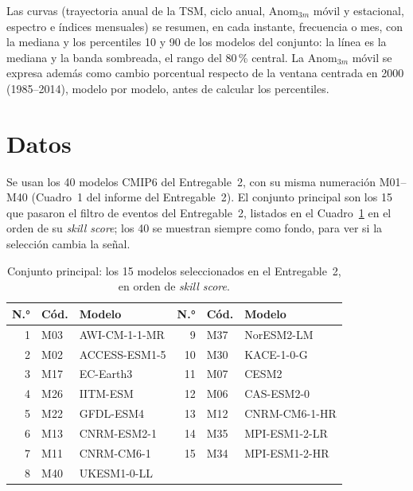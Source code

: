 \documentclass[11pt,a4paper]{article}
\begin{document}
Las curvas (trayectoria anual de la TSM, ciclo anual, $\mathrm{Anom}_{3m}$ móvil y estacional, espectro e índices mensuales) se resumen, en cada instante, frecuencia o mes, con la mediana y los percentiles 10 y 90 de los modelos del conjunto: la línea es la mediana y la banda sombreada, el rango del 80\,\% central.
La $\mathrm{Anom}_{3m}$ móvil se expresa además como cambio porcentual respecto de la ventana centrada en 2000 (1985--2014), modelo por modelo, antes de calcular los percentiles.


\section{Datos}
\label{sec:datos}

Se usan los 40 modelos CMIP6 del Entregable~2, con su misma numeración M01--M40 (Cuadro~1 del informe del Entregable~2).
El conjunto principal son los 15 que pasaron el filtro de eventos del Entregable~2, listados en el Cuadro~\ref{tab:seleccion} en el orden de su \emph{skill score}; los 40 se muestran siempre como fondo, para ver si la selección cambia la señal.

\begin{table}[htbp]
\caption{Conjunto principal: los 15 modelos seleccionados en el Entregable~2, en orden de \emph{skill score}.}
\label{tab:seleccion}
\centering
\footnotesize
\begin{tabular}{@{}rll@{\hspace{2em}}rll@{}}
\toprule
\textbf{N.°} & \textbf{Cód.} & \textbf{Modelo} & \textbf{N.°} & \textbf{Cód.} & \textbf{Modelo} \\
\midrule
1 & M03 & AWI-CM-1-1-MR & 9 & M37 & NorESM2-LM \\
2 & M02 & ACCESS-ESM1-5 & 10 & M30 & KACE-1-0-G \\
3 & M17 & EC-Earth3 & 11 & M07 & CESM2 \\
4 & M26 & IITM-ESM & 12 & M06 & CAS-ESM2-0 \\
5 & M22 & GFDL-ESM4 & 13 & M12 & CNRM-CM6-1-HR \\
6 & M13 & CNRM-ESM2-1 & 14 & M35 & MPI-ESM1-2-LR \\
7 & M11 & CNRM-CM6-1 & 15 & M34 & MPI-ESM1-2-HR \\
8 & M40 & UKESM1-0-LL & & & \\
\bottomrule
\end{tabular}
\end{table}
\end{document}
